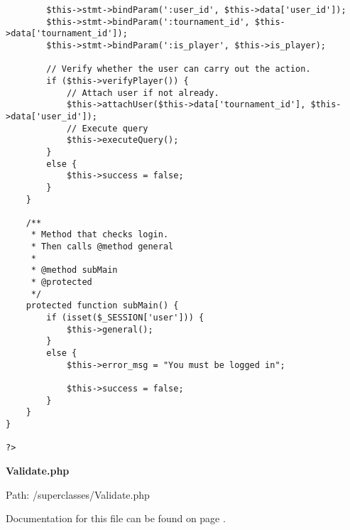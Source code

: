 {\begin{lstlisting}
		$this->stmt->bindParam(':user_id', $this->data['user_id']);
		$this->stmt->bindParam(':tournament_id', $this->data['tournament_id']);
		$this->stmt->bindParam(':is_player', $this->is_player);

		// Verify whether the user can carry out the action.
		if ($this->verifyPlayer()) {
			// Attach user if not already.
			$this->attachUser($this->data['tournament_id'], $this->data['user_id']);
			// Execute query
			$this->executeQuery();
		}
		else {
			$this->success = false;
		}
	}

	/**
	 * Method that checks login.
	 * Then calls @method general
	 *
	 * @method subMain
	 * @protected
	 */
	protected function subMain() {
		if (isset($_SESSION['user'])) {
			$this->general();
		}
		else {
			$this->error_msg = "You must be logged in";

			$this->success = false;
		}
	}
}

?>\end{lstlisting}
}
\textbf{Validate.php}\label{Validate.php}

Path: /superclasses/Validate.php

Documentation for this file can be found on page \pageref{Validate.php.doc}.

